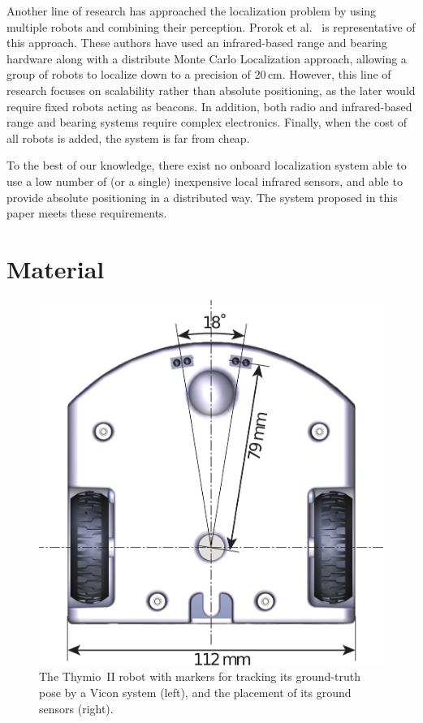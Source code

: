 \documentclass[letterpaper, 10pt, conference]{ieeeconf}
\begin{document}
Another line of research has approached the localization problem by using multiple robots and combining their perception.
Prorok et al.~\cite{prorok2012low} is representative of this approach.
These authors have used an infrared-based range and bearing hardware along with a distribute Monte Carlo Localization approach, allowing a group of robots to localize down to a precision of 20\,cm.
However, this line of research focuses on scalability rather than absolute positioning, as the later would require fixed robots acting as beacons.
In addition, both radio and infrared-based range and bearing systems require complex electronics.
Finally, when the cost of all robots is added, the system is far from cheap.

To the best of our knowledge, there exist no onboard localization system able to use a low number of (or a single) inexpensive local infrared sensors, and able to provide absolute positioning in a distributed way.
The system proposed in this paper meets these requirements.

\section{Material}
\begin{figure}
\hfill
\includegraphics[width=.43\columnwidth]{thymio2-dimensions}
\vspace{-.07cm}
\caption{The Thymio~II robot with markers for tracking its ground-truth pose by a Vicon system (left), and the placement of its ground sensors (right).}
\label{fig:thymio}
\end{figure}
\end{document}
